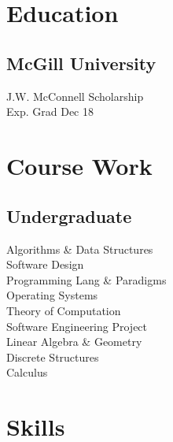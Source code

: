 \documentclass[]{allanwang-resume}
\begin{document}
 
\header

\begin{minipage}[t][][b]{0.33\textwidth}~

	~\\


	\section{Education}
	\subsection{McGill University}
	J.W. McConnell Scholarship \\
	Exp. Grad Dec 18
	\sectionsep

	\section{Course Work}
	\subsection{Undergraduate}
	Algorithms \& Data Structures \\
	Software Design \\
	Programming Lang \& Paradigms \\
	Operating Systems \\
	Theory of Computation \\
	Software Engineering Project \\
	Linear Algebra \& Geometry \\
	Discrete Structures \\
	Calculus \\
	\sectionsep

	\section{Skills}

\end{minipage}
\end{document}
